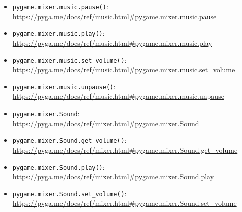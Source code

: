 \begin{pygbox}
\begin{itemize}
	\item \texttt{pygame.mixer.music.pause()}:
	\\ \url{https://pyga.me/docs/ref/music.html#pygame.mixer.music.pause}

	\item \texttt{pygame.mixer.music.play()}:
	\\ \url{https://pyga.me/docs/ref/music.html#pygame.mixer.music.play}

	\item \texttt{pygame.mixer.music.set\_volume()}:
	\\ \url{https://pyga.me/docs/ref/music.html#pygame.mixer.music.set_volume}

	\item \texttt{pygame.mixer.music.unpause()}:
	\\ \url{https://pyga.me/docs/ref/music.html#pygame.mixer.music.unpause}

	\item \texttt{pygame.mixer.Sound}:
	\\ \url{https://pyga.me/docs/ref/mixer.html#pygame.mixer.Sound}

	\item \texttt{pygame.mixer.Sound.get\_volume()}:
	\\ \url{https://pyga.me/docs/ref/mixer.html#pygame.mixer.Sound.get_volume}

	\item \texttt{pygame.mixer.Sound.play()}:
	\\ \url{https://pyga.me/docs/ref/mixer.html#pygame.mixer.Sound.play}

	\item \texttt{pygame.mixer.Sound.set\_volume()}:
	\\ \url{https://pyga.me/docs/ref/mixer.html#pygame.mixer.Sound.set_volume}

\end{itemize}
\end{pygbox}
